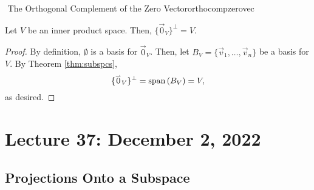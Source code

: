         \begin{theorem}{\Stop\,\,The Orthogonal Complement of the Zero Vector}{orthocompzerovec}

            Let \(V\) be an inner product space. Then, \(\{\vec{0}_V\}^\perp=V\).
            \begin{proof}
                By definition, \(\emptyset\) is a basis for \(\vec{0}_V\). Then, let \(B_V=\{\vec{v}_1,\ldots,\vec{v}_n\}\) be a basis for \(V\). By Theorem \ref{thm:subspcs},
                \begin{equation*}
                    \{\overset{_{\rightharpoonup}}{0}_V\}^\perp=\text{span\,}(B_V)=V,
                \end{equation*}
                as desired.
            \end{proof}
            
        \end{theorem}

        \pagebreak

\section{Lecture 37: December 2, 2022}

    \subsection{Projections Onto a Subspace}

